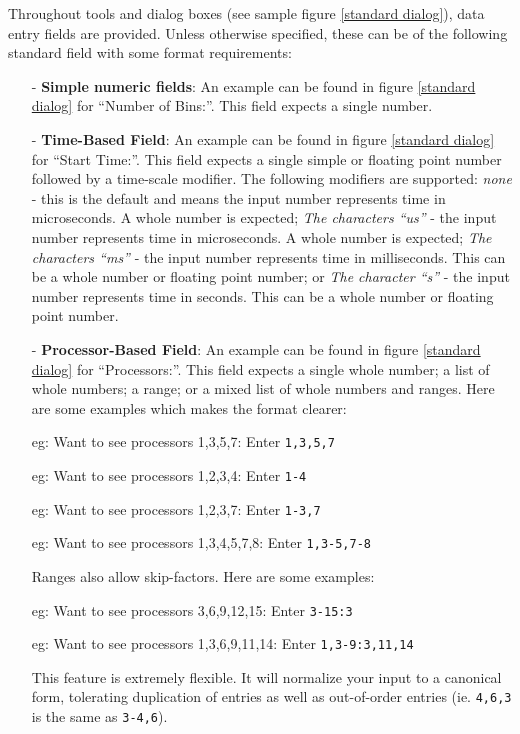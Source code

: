 \documentclass[10pt]{report}
\begin{document}
Throughout \projections{} tools and dialog boxes (see sample figure
\ref{standard dialog}), data entry fields are provided. Unless
otherwise specified, these can be of the following standard field with
some format requirements:

\begin{itemize}
\item[-] {\bf Simple numeric fields}: An example can be found in
figure \ref{standard dialog} for ``Number of Bins:''. This field expects
a single number.
\item[-] {\bf Time-Based Field}: An example can be found in figure
\ref{standard dialog} for ``Start Time:''. This field expects a single
simple or floating point number followed by a time-scale modifier. The
following modifiers are supported: {\it none} - this is the default
and means the input number represents time in microseconds. A whole
number is expected; {\it The characters ``us''} - the input number
represents time in microseconds. A whole number is expected; {\it The
characters ``ms''} - the input number represents time in
milliseconds. This can be a whole number or floating point number; or
{\it The character ``s''} - the input number represents time in
seconds. This can be a whole number or floating point number.
\item[-] {\bf Processor-Based Field}: An example can be found in
figure \ref{standard dialog} for ``Processors:''. This field expects a
single whole number; a list of whole numbers; a range; or a mixed list
of whole numbers and ranges. Here are some examples which makes the
format clearer:

   eg: Want to see processors 1,3,5,7:  Enter {\tt 1,3,5,7}

   eg: Want to see processors 1,2,3,4:  Enter {\tt 1-4}

   eg: Want to see processors 1,2,3,7:  Enter {\tt 1-3,7}

   eg: Want to see processors 1,3,4,5,7,8: Enter {\tt 1,3-5,7-8}

Ranges also allow skip-factors. Here are some examples:

   eg: Want to see processors 3,6,9,12,15: Enter {\tt 3-15:3}

   eg: Want to see processors 1,3,6,9,11,14: Enter {\tt 1,3-9:3,11,14}

This feature is extremely flexible. It will normalize your input to a
canonical form, tolerating duplication of entries as well as
out-of-order entries (ie. {\tt 4,6,3} is the same as {\tt 3-4,6}).
\end{itemize}
\end{document}
